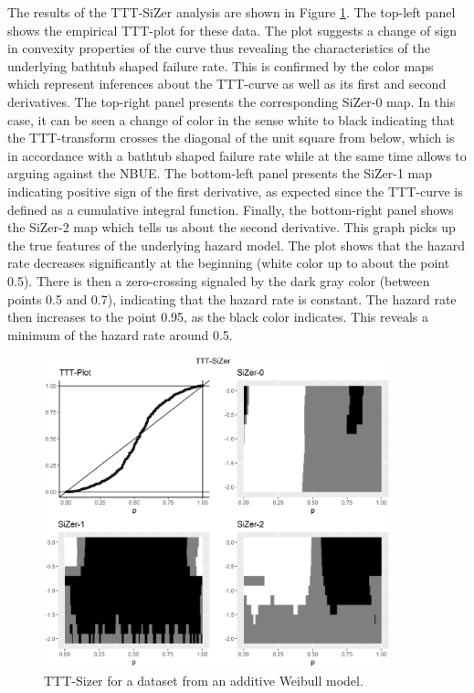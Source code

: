 \documentclass[preprint,12pt]{elsarticle}
\begin{document}
The results of the TTT-SiZer analysis are shown in Figure \ref{Fig:simulatedSizer}. The top-left panel shows the empirical TTT-plot for these data. The plot suggests a change of sign in convexity properties of the curve thus revealing the characteristics of the underlying  bathtub shaped failure rate. This is confirmed by the color maps which represent inferences about the TTT-curve as well as its first and second derivatives. The top-right panel presents the corresponding SiZer-0 map. In this case, it can be seen a change of color in the sense white to black indicating that the TTT-transform crosses the diagonal of the unit square from below, which is in accordance with a bathtub shaped failure rate while at the same time allows to arguing against the NBUE. The bottom-left panel presents the SiZer-1 map indicating positive sign of the first derivative, as expected since the TTT-curve is defined as a cumulative integral function. Finally, the bottom-right panel shows the SiZer-2 map which tells us about the second derivative. This graph picks up the true features of the underlying hazard model. 
The plot shows that the hazard rate decreases significantly at the beginning (white color up to about the point 0.5). There is then a zero-crossing  signaled by the dark gray color  (between points 0.5 and 0.7), indicating that the hazard rate is constant. The hazard rate then increases to the point 0.95, as the black color indicates. This reveals a minimum of the hazard rate around 0.5.
  

\begin{figure}[htb]
\begin{center}
\includegraphics[height=9cm]{Fig2_motivatingSiZerCubic_log10}%
\caption{TTT-Sizer for a dataset from an additive Weibull model.}\label{Fig:simulatedSizer}
\end{center}
\end{figure}
\end{document}
